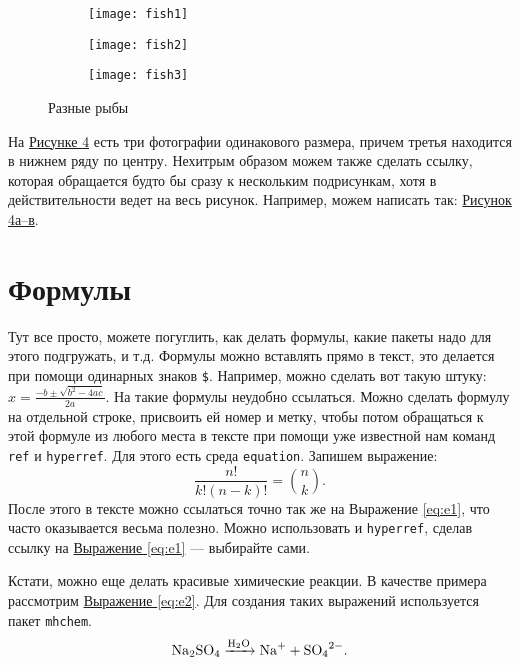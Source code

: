 \begin{figure}[!ht]
	\centering
\hspace*{\fill}%
	\begin{subfigure}[b]{0.33\textwidth}
        \centering
		\texttt{[image: fish1]}
		\caption{}
		\label{fig:fish1}
	\end{subfigure}
\hfill
	\begin{subfigure}[b]{0.33\textwidth}
        \centering
		\texttt{[image: fish2]}
        \caption{}
		\label{fig:fish2}
	\end{subfigure}
\hspace*{\fill}%
\par\vspace{\abovecaptionskip}
        \begin{subfigure}[b]{0.33\textwidth}
        \centering
		\texttt{[image: fish3]}
		\caption{}
		\label{fig:fish3}
	\end{subfigure}
	\caption{Разные рыбы}
	\label{fig:fish}
\end{figure}

На \hyperref[fig:fish]{Рисунке \ref*{fig:fish}} есть три фотографии одинакового размера, причем третья находится в нижнем ряду по центру. Нехитрым образом можем также сделать ссылку, которая обращается будто бы сразу к нескольким подрисункам, хотя в действительности ведет на весь рисунок. Например, можем написать так: \hyperref[fig:fish]{Рисунок \ref*{fig:fish}а--в}.

\section{Формулы}
\label{sec:equ}

Тут все просто, можете погуглить, как делать формулы, какие пакеты надо для этого подгружать, и т.д. Формулы можно вставлять прямо в текст, это делается при помощи одинарных знаков \verb|$|. Например, можно сделать вот такую штуку: $x = \frac{-b \pm \sqrt{b^2-4ac}}{2a}$. На такие формулы неудобно ссылаться. Можно сделать формулу на отдельной строке, присвоить ей номер и метку, чтобы потом обращаться к этой формуле из любого места в тексте при помощи уже известной нам команд \verb|ref| и \verb|hyperref|. Для этого есть среда \verb|equation|. Запишем выражение:
\begin{equation}
\label{eq:e1}
\frac{n!}{k!(n-k)!} = \binom{n}{k}.
\end{equation}
После этого в тексте можно ссылаться точно так же на Выражение \ref{eq:e1}, что часто оказывается весьма полезно. Можно использовать и \verb|hyperref|, сделав ссылку на \hyperref[eq:e1]{Выражение \ref*{eq:e1}} --- выбирайте сами.

Кстати, можно еще делать красивые химические реакции. В качестве примера рассмотрим \hyperref[eq:e2]{Выражение \ref*{eq:e2}}. Для создания таких выражений используется пакет \verb|mhchem|.
\begin{equation}
    \label{eq:e2}
    \ce{Na2SO4 ->[H2O] Na+ + SO4^2-}.
\end{equation}

\endinput